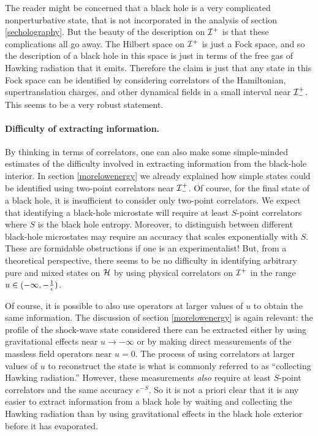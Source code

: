 \documentclass[12pt]{article}
\def \scrip{{\cal I}^{+}}
\def \scrippast{{\cal I}^{+}_{-}}
\begin{document}
The reader might be concerned that a black hole is a very complicated nonperturbative state, that is not incorporated in the analysis of section \ref{secholography}.  But the beauty of  the description on $\scrip$ is that these complications all go away. The Hilbert space on $\scrip$ is just a Fock space, and so the description of a black hole in this space is just in terms of the free gas of Hawking radiation that it emits.  Therefore the claim 
is just that any state in this Fock space can be identified by considering correlators of the Hamiltonian, supertranslation charges, and other dynamical fields in a small interval near $\scrippast$.   This seems to be a very robust statement. 

\paragraph{\bf Difficulty of extracting information.} By thinking in terms of correlators, one can also make some simple-minded estimates of the difficulty involved in extracting information from the black-hole interior.  In  section \ref{morelowenergy} we already explained how simple states could be identified using two-point correlators near $\scrippast$.  Of course, for the final state of a black hole, it is insufficient to consider only two-point correlators. We expect that identifying a black-hole microstate will require at least $S$-point correlators where $S$ is the black hole entropy. Moreover, to distinguish between different black-hole microstates may require an accuracy that scales exponentially with $S$. These are formidable obstructions if one is an experimentalist! But, from a theoretical perspective, there seems to be no difficulty in identifying arbitrary pure and mixed states on ${\cal H}$ by using physical correlators on $\scrip$ in the range $u \in (-\infty, -{1 \over \epsilon})$.

Of course, it is possible to also use operators at larger values of $u$ to obtain the same information. The discussion of section \ref{morelowenergy} is again relevant: the profile of the shock-wave state considered there can be extracted either by using gravitational effects near $u \rightarrow -\infty$ or by making direct measurements of the massless field operators near $u = 0$. The process of using correlators at larger values of $u$ to reconstruct the state is what is commonly referred to as ``collecting Hawking radiation.'' However, these measurements {\em also} require at least $S$-point correlators and the same accuracy $e^{-S}$. So it is not a priori clear that it is any easier to extract information from a black hole by waiting and collecting the Hawking radiation than by using gravitational effects in the black hole exterior before it has evaporated. 
\end{document}
